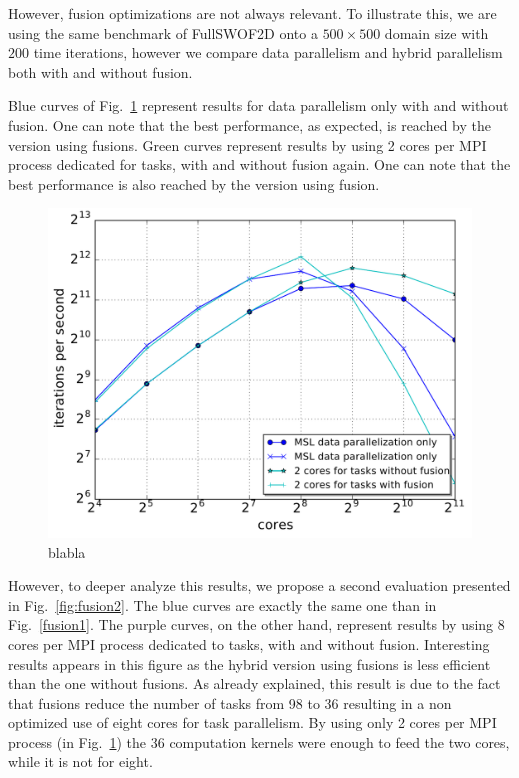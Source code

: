 However, fusion optimizations are not always relevant. To illustrate this, we are using the same benchmark of FullSWOF2D onto a $500 \times 500$ domain size with $200$ time iterations, however we compare data parallelism and hybrid parallelism both with and without fusion. 

Blue curves of Fig.~\ref{fig:fusion1} represent results for data parallelism only with and without fusion. One can note that the best performance, as expected, is reached by the version using fusions. Green curves represent results by using 2 cores per MPI process dedicated for tasks, with and without fusion again. One can note that the best performance is also reached by the version using fusion.

\begin{figure}[!h]\begin{center}
  \includegraphics[width=.6\textwidth]{../results/task_scaling/500_200/withwithout2_close_median.pdf}
  \caption{blabla}
  \label{fig:fusion1}
\end{center}\end{figure}

However, to deeper analyze this results, we propose a second evaluation presented in Fig.~\ref{fig:fusion2}. The blue curves are exactly the same one than in Fig.~\ref{fusion1}. The purple curves, on the other hand, represent results by using 8 cores per MPI process dedicated to tasks, with and without fusion. Interesting results appears in this figure as the hybrid version using fusions is less efficient than the one without fusions. As already explained, this result is due to the fact that fusions reduce the number of tasks from 98 to 36 resulting in a non optimized use of eight cores for task parallelism. By using only 2 cores per MPI process (in Fig.~\ref{fig:fusion1}) the 36 computation kernels were enough to feed the two cores, while it is not for eight.

